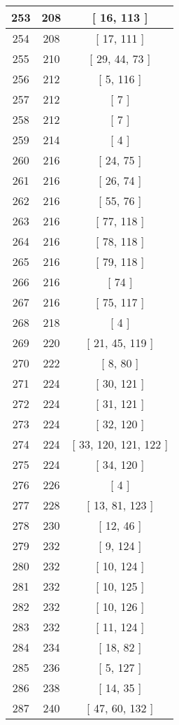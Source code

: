 \begin{center}
\begin{longtable}[H]{|| c c c ||}
\hline
253 & 208 & [ 16, 113 ] \\ 
\hline
254 & 208 & [ 17, 111 ] \\ 
\hline
255 & 210 & [ 29, 44, 73 ] \\ 
\hline
256 & 212 & [ 5, 116 ] \\ 
\hline
257 & 212 & [ 7 ] \\ 
\hline
258 & 212 & [ 7 ] \\ 
\hline
259 & 214 & [ 4 ] \\ 
\hline
260 & 216 & [ 24, 75 ] \\ 
\hline
261 & 216 & [ 26, 74 ] \\ 
\hline
262 & 216 & [ 55, 76 ] \\ 
\hline
263 & 216 & [ 77, 118 ] \\ 
\hline
264 & 216 & [ 78, 118 ] \\ 
\hline
265 & 216 & [ 79, 118 ] \\ 
\hline
266 & 216 & [ 74 ] \\ 
\hline
267 & 216 & [ 75, 117 ] \\ 
\hline
268 & 218 & [ 4 ] \\ 
\hline
269 & 220 & [ 21, 45, 119 ] \\ 
\hline
270 & 222 & [ 8, 80 ] \\ 
\hline
271 & 224 & [ 30, 121 ] \\ 
\hline
272 & 224 & [ 31, 121 ] \\ 
\hline
273 & 224 & [ 32, 120 ] \\ 
\hline
274 & 224 & [ 33, 120, 121, 122 ] \\ 
\hline
275 & 224 & [ 34, 120 ] \\ 
\hline
276 & 226 & [ 4 ] \\ 
\hline
277 & 228 & [ 13, 81, 123 ] \\ 
\hline
278 & 230 & [ 12, 46 ] \\ 
\hline
279 & 232 & [ 9, 124 ] \\ 
\hline
280 & 232 & [ 10, 124 ] \\ 
\hline
281 & 232 & [ 10, 125 ] \\ 
\hline
282 & 232 & [ 10, 126 ] \\ 
\hline
283 & 232 & [ 11, 124 ] \\ 
\hline
284 & 234 & [ 18, 82 ] \\ 
\hline
285 & 236 & [ 5, 127 ] \\ 
\hline
286 & 238 & [ 14, 35 ] \\ 
\hline
287 & 240 & [ 47, 60, 132 ] \\ 

\end{longtable}
\end{center}
